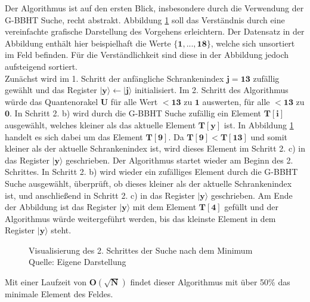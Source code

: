 Der Algorithmus ist auf den ersten Blick, insbesondere durch die Verwendung der G-BBHT Suche, recht abstrakt. 
Abbildung \ref{fig:sucheMinimumVisualisierung} soll das Verständnis durch eine vereinfachte grafische Darstellung des Vorgehens erleichtern. 
Der Datensatz in der Abbildung enthält hier beispielhaft die Werte $\mathbf{\{1, ..., 18\}}$, welche sich unsortiert im Feld befinden. Für die Verständlichkeit sind diese in der Abbildung jedoch aufsteigend sortiert.
\\
Zunächst wird im 1. Schritt der anfängliche Schrankenindex $\mathbf{j = 13}$ zufällig gewählt und das Register $\mathbf{|y\rangle \leftarrow |j\rangle}$ initialisiert. 
Im 2. Schritt des Algorithmus würde das Quantenorakel $\mathbf{U}$ für alle Wert $\mathbf{< 13}$ zu $\mathbf{1}$ auswerten, für alle $\mathbf{< 13}$ zu $\mathbf{0}$.
In Schritt 2. b) wird durch die G-BBHT Suche zufällig ein Element $\mathbf{T[i]}$ ausgewählt, welches kleiner als das aktuelle Element $\mathbf{T[y]}$ ist. 
In Abbildung \ref{fig:sucheMinimumVisualisierung} handelt es sich dabei um das Element $\mathbf{T[9]}$.
Da $\mathbf{T[9] < T[13]}$ und somit kleiner als der aktuelle Schrankenindex ist, wird dieses Element im Schritt 2. c) in das Register $\mathbf{|y\rangle}$ geschrieben.
Der Algorithmus startet wieder am Beginn des 2. Schrittes. In Schritt 2. b) wird wieder ein zufälliges Element durch die G-BBHT Suche ausgewählt, überprüft, ob dieses kleiner als der aktuelle Schrankenindex ist, und anschließend in Schritt 2. c) in das Register $\mathbf{|y\rangle}$ geschrieben.
Am Ende der Abbildung ist das Register $\mathbf{|y\rangle}$ mit dem Element $\mathbf{T[4]}$ gefüllt und der Algorithmus würde weitergeführt werden, bis das kleinste Element in dem Register $\mathbf{|y\rangle}$ steht.
\begin{figure}[hbtp]
	\centering
	\caption{Visualisierung des 2. Schrittes der Suche nach dem Minimum \\ Quelle: Eigene Darstellung}
	\label{fig:sucheMinimumVisualisierung}
\end{figure} 

Mit einer Laufzeit von $\mathbf{O(\sqrt{N})}$ findet dieser Algorithmus mit über 50\% das minimale Element des Feldes.
